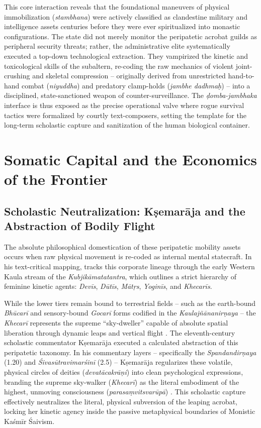\documentclass[11pt,twoside,letterpaper]{article}
\begin{document}
This core interaction reveals that the foundational maneuvers of physical immobilization (\textit{stambhana}) were actively classified as clandestine military and intelligence assets centuries before they were ever spiritualized into monastic configurations. The state did not merely monitor the peripatetic acrobat guilds as peripheral security threats; rather, the administrative elite systematically executed a top-down technological extraction. They vampirized the kinetic and toxicological skills of the subaltern, re-coding the raw mechanics of violent joint-crushing and skeletal compression – originally derived from unrestricted hand-to-hand combat (\textit{niyuddha}) and predatory clamp-holds (\textit{jambhe dadhmaḥ}) – into a disciplined, state-sanctioned weapon of counter-surveillance. The \textit{ḍomba-jambhaka} interface is thus exposed as the precise operational valve where rogue survival tactics were formalized by courtly text-composers, setting the template for the long-term scholastic capture and sanitization of the human biological container.




\section{Somatic Capital and the Economics of the Frontier}

\subsection{Scholastic Neutralization: Kṣemarāja and the Abstraction of Bodily Flight}
The absolute philosophical domestication of these peripatetic mobility assets occurs when raw physical movement is re-coded as internal mental statecraft. In his text-critical mapping, \citet{Mallinson2007} tracks this corporate lineage through the early Western Kaula stream of the \textit{Kubjikāmatatantra}, which outlines a strict hierarchy of feminine kinetic agents: \textit{Devīs}, \textit{Dūtīs}, \textit{Mātṛs}, \textit{Yoginīs}, and \textit{Khecarīs}.

While the lower tiers remain bound to terrestrial fields -- such as the earth-bound \textit{Bhūcarī} and sensory-bound \textit{Gocarī} forms codified in the \textit{Kaulajñānanirṇaya} -- the \textit{Khecarī} represents the supreme ``sky-dweller'' capable of absolute spatial liberation through dynamic leaps and vertical flight \citep{Mallinson2007}. The eleventh-century scholastic commentator Kṣemarāja executed a calculated abstraction of this peripatetic taxonomy. In his commentary layers -- specifically the \textit{Spandandirṇaya} (1.20) and \textit{Śivasūtravimarśinī} (2.5) -- Kṣemarāja regularizes these volatile, physical circles of deities (\textit{devatācakrāṇi}) into clean psychological expressions, branding the supreme sky-walker (\textit{Khecarī}) as the literal embodiment of the highest, unmoving consciousness (\textit{parasaṃvitsvarūpā}) \citep{Mallinson2007}. This scholastic capture effectively neutralizes the literal, physical subversion of the leaping acrobat, locking her kinetic agency inside the passive metaphysical boundaries of Monistic Kaśmīr Śaivism.
\end{document}
